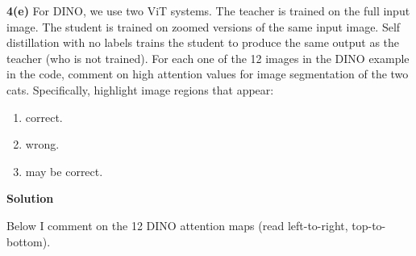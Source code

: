 \documentclass[10pt]{article}
\begin{document}
\textbf{4(e)} For DINO, we use two ViT systems. The teacher is trained on the full input image. The student is trained on zoomed versions of the same input image. Self distillation with no labels trains the student to produce the same output as the teacher (who is not trained). For each one of the 12 images in the DINO example in the code, comment on high attention values for image segmentation of the two cats. Specifically, highlight image regions that appear:

\begin{enumerate}[label=\roman*.]
    \item correct.
    \item wrong.
    \item may be correct.
\end{enumerate}

\textbf{Solution}

Below I comment on the 12 DINO attention maps (read left-to-right, top-to-bottom).
\end{document}
